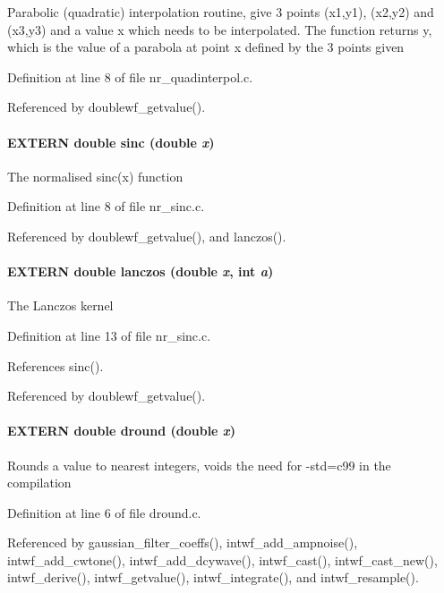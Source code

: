 Parabolic (quadratic) interpolation routine, give 3 points (x1,y1), (x2,y2) and (x3,y3) and a value x which needs to be interpolated. The function returns y, which is the value of a parabola at point x defined by the 3 points given 

Definition at line 8 of file nr\_\-quadinterpol.c.

Referenced by doublewf\_\-getvalue().
\paragraph[sinc]{\setlength{\rightskip}{0pt plus 5cm}EXTERN double sinc (double {\em x})}\hfill\label{group__nr_g8b766550774b545c7ba75a88cd67b635}


The normalised sinc(x) function 

Definition at line 8 of file nr\_\-sinc.c.

Referenced by doublewf\_\-getvalue(), and lanczos().
\paragraph[lanczos]{\setlength{\rightskip}{0pt plus 5cm}EXTERN double lanczos (double {\em x}, \/  int {\em a})}\hfill\label{group__nr_g78e13c70f5942b26d8a6976a21e79f8a}


The Lanczos kernel 

Definition at line 13 of file nr\_\-sinc.c.

References sinc().

Referenced by doublewf\_\-getvalue().
\paragraph[dround]{\setlength{\rightskip}{0pt plus 5cm}EXTERN double dround (double {\em x})}\hfill\label{group__nr_ga92b5b3e2a75561e2797cc578fc2bd7e}


Rounds a value to nearest integers, voids the need for -std=c99 in the compilation 

Definition at line 6 of file dround.c.

Referenced by gaussian\_\-filter\_\-coeffs(), intwf\_\-add\_\-ampnoise(), intwf\_\-add\_\-cwtone(), intwf\_\-add\_\-dcywave(), intwf\_\-cast(), intwf\_\-cast\_\-new(), intwf\_\-derive(), intwf\_\-getvalue(), intwf\_\-integrate(), and intwf\_\-resample().